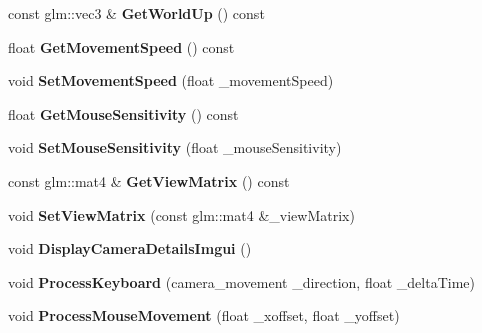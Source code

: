 \begin{DoxyCompactItemize}
\mbox{\label{classpiolot_1_1_camera_afe3908486ce13772bf593a666869667a}} 
const glm\+::vec3 \& {\bfseries Get\+World\+Up} () const
\item 
\mbox{\label{classpiolot_1_1_camera_ad270b37d787605772644f35b844992b0}} 
float {\bfseries Get\+Movement\+Speed} () const
\item 
\mbox{\label{classpiolot_1_1_camera_aaf2988ab05281a6a1404207a76957ad6}} 
void {\bfseries Set\+Movement\+Speed} (float \+\_\+movement\+Speed)
\item 
\mbox{\label{classpiolot_1_1_camera_a4f9b65c8df717b82c3b7193457ce71f0}} 
float {\bfseries Get\+Mouse\+Sensitivity} () const
\item 
\mbox{\label{classpiolot_1_1_camera_ade560e16d6c3775dab0637873e66e762}} 
void {\bfseries Set\+Mouse\+Sensitivity} (float \+\_\+mouse\+Sensitivity)
\item 
\mbox{\label{classpiolot_1_1_camera_ad57c30f9e3f381a492b38566eab4b905}} 
const glm\+::mat4 \& {\bfseries Get\+View\+Matrix} () const
\item 
\mbox{\label{classpiolot_1_1_camera_adf17d4592d4d144ea3deab9d8d5d836d}} 
void {\bfseries Set\+View\+Matrix} (const glm\+::mat4 \&\+\_\+view\+Matrix)
\item 
\mbox{\label{classpiolot_1_1_camera_aa9172dabf1f037963c8f93f7b774cd9e}} 
void {\bfseries Display\+Camera\+Details\+Imgui} ()
\item 
\mbox{\label{classpiolot_1_1_camera_a55a4d1a5773d240f08c766e6566591b3}} 
void {\bfseries Process\+Keyboard} (camera\+\_\+movement \+\_\+direction, float \+\_\+delta\+Time)
\item 
\mbox{\label{classpiolot_1_1_camera_ae6e18ad2ee8ca787ffe5fa35a01dd16b}} 
void {\bfseries Process\+Mouse\+Movement} (float \+\_\+xoffset, float \+\_\+yoffset)
\item 
\mbox{\label{classpiolot_1_1_camera_a6f2dd8513b5f87e438e2721bd32b22c0}} 

\end{DoxyCompactItemize}
